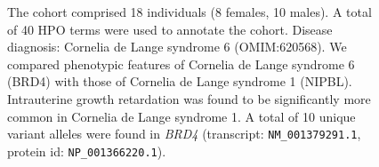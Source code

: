 \begin{figure}[htbp]
\vspace{2em}

\caption{The cohort comprised 18 individuals (8 females, 10 males). A total of 40 HPO terms were used to annotate the cohort. Disease diagnosis: Cornelia de Lange syndrome 6 (OMIM:620568). 
We compared phenotypic features of Cornelia de Lange syndrome 6 (BRD4) with those of Cornelia de Lange syndrome 1 (NIPBL).
Intrauterine growth retardation was found to be significantly more common in Cornelia de Lange syndrome 1.
A total of 10 unique variant alleles were found in \textit{BRD4} (transcript: \texttt{NM\_001379291.1}, protein id: \texttt{NP\_001366220.1}).}
\end{figure}
